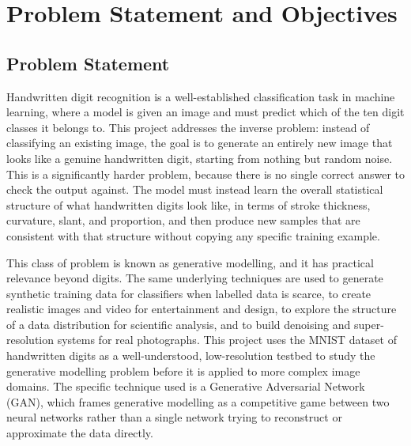 \documentclass[12pt,a4paper]{article}
\begin{document}
\newpage

\tableofcontents
\newpage
\listoffigures
\listoftables
\newpage

\setcounter{page}{1}

\section{Problem Statement and Objectives}

\subsection{Problem Statement}

Handwritten digit recognition is a well-established classification task in machine
learning, where a model is given an image and must predict which of the ten digit
classes it belongs to. This project addresses the inverse problem: instead of
classifying an existing image, the goal is to generate an entirely new image that looks
like a genuine handwritten digit, starting from nothing but random noise. This is a
significantly harder problem, because there is no single correct answer to check the
output against. The model must instead learn the overall statistical structure of what
handwritten digits look like, in terms of stroke thickness, curvature, slant, and
proportion, and then produce new samples that are consistent with that structure without
copying any specific training example.

This class of problem is known as generative modelling, and it has practical relevance
beyond digits. The same underlying techniques are used to generate synthetic training
data for classifiers when labelled data is scarce, to create realistic images and video
for entertainment and design, to explore the structure of a data distribution for
scientific analysis, and to build denoising and super-resolution systems for real
photographs. This project uses the MNIST dataset of handwritten digits as a
well-understood, low-resolution testbed to study the generative modelling problem before
it is applied to more complex image domains. The specific technique used is a Generative
Adversarial Network (GAN), which frames generative modelling as a competitive game
between two neural networks rather than a single network trying to reconstruct or
approximate the data directly.
\end{document}
